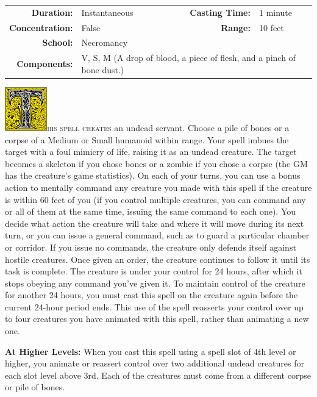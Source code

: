 \documentclass[12pt,showtrims]{memoir}
\begin{document}
{
\small\centering\vspace{-6pt}
\begin{tabular}{rlrl}
\toprule

\textbf{Duration:} & Instantaneous &
\textbf{Casting Time:} & 1 minute \\
\textbf{Concentration:} & False &
\textbf{Range:} & 10 feet \\
\textbf{School:} & Necromancy \\
\textbf{Components:} & \multicolumn{3}{p{0.7\textwidth}}{V, S, M (A drop of blood, a piece of flesh, and a pinch of bone dust.)}\\

\bottomrule
\end{tabular}
}

\vspace{1\baselineskip}\noindent
\lettrine[lines=4]{\includegraphics[height=54pt]{initials/T.png}}{his spell creates} an undead servant. Choose a pile of bones or a corpse of a Medium or Small humanoid within range. Your spell imbues the target with a foul mimicry of life, raising it as an undead creature. The target becomes a skeleton if you chose bones or a zombie if you chose a corpse (the GM has the creature's game statistics). On each of your turns, you can use a bonus action to mentally command any creature you made with this spell if the creature is within 60 feet of you (if you control multiple creatures, you can command any or all of them at the same time, issuing the same command to each one). You decide what action the creature will take and where it will move during its next turn, or you can issue a general command, such as to guard a particular chamber or corridor. If you issue no commands, the creature only defends itself against hostile creatures. Once given an order, the creature continues to follow it until its task is complete. The creature is under your control for 24 hours, after which it stops obeying any command you've given it. To maintain control of the creature for another 24 hours, you must cast this spell on the creature again before the current 24-hour period ends. This use of the spell reasserts your control over up to four creatures you have animated with this spell, rather than animating a new one.

\vspace{8pt} \noindent\textbf{At Higher Levels:} When you cast this spell using a spell slot of 4th level or higher, you animate or reassert control over two additional undead creatures for each slot level above 3rd. Each of the creatures must come from a different corpse or pile of bones.
\newpage
\end{document}
